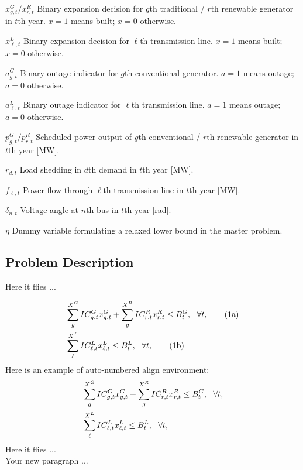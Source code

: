 \documentclass[journal]{IEEEtran}
\begin{document}
\begin{IEEEdescription}
\item[$x_{g,t}^G/x_{r,t}^R$] Binary expansion decision for $g$th traditional / $r$th renewable generator in $t$th year. $x=1$ means built; $x=0$ otherwise.
\item[$x_{\ell,t}^L$] Binary expansion decision for $\ell$th transmission line. $x=1$ means built; $x=0$ otherwise.
\item[$a_{g,t}^G$] Binary outage indicator for $g$th conventional generator. $a=1$ means outage; $a=0$ otherwise.
\item[$a_{\ell,t}^L$] Binary outage indicator for $\ell$th transmission line. $a=1$ means outage; $a=0$ otherwise.
\item[$p^G_{g,t}/p^R_{r,t}$] Scheduled power output of $g$th conventional / $r$th renewable generator in $t$th year [MW].
\item[$r_{d,t}$] Load shedding in $d$th demand in $t$th year [MW].
\item[$f_{\ell,t}$] Power flow through $\ell$th transmission line in $t$th year [MW].
\item[$\delta_{n,t}$] Voltage angle at $n$th bus in $t$th year [rad].
\item[$\eta$] Dummy variable formulating a relaxed lower bound in the master problem.
\end{IEEEdescription}
\subsection{Problem Description}
Here it flies ...


\begin{align*} 
\makebox[0cm][r]~&\sum_{g}^{X^G}IC_{g,t}^Gx_{g,t}^G+\sum_{g}^{X^R}IC_{r,t}^Rx_{r,t}^R\leq B_t^G, \ \ \forall t, \tag{1a}\\
& \sum_{\ell}^{X^L}IC_{\ell,t}^Lx_{\ell,t}^L\leq B_t^L, \ \ \forall t, \tag{1b} 
\end{align*}
Here is an example of auto-numbered align environment:
\begin{align} 
\makebox[0cm][r]~&\sum_{g}^{X^G}IC_{g,t}^Gx_{g,t}^G+\sum_{g}^{X^R}IC_{r,t}^Rx_{r,t}^R\leq B_t^G, \ \ \forall t, \\
& \sum_{\ell}^{X^L}IC_{\ell,t}^Lx_{\ell,t}^L\leq B_t^L, \ \ \forall t,  
\end{align}
\noindent Here it flies ...\\
\indent Your new paragraph ...
\end{document}
